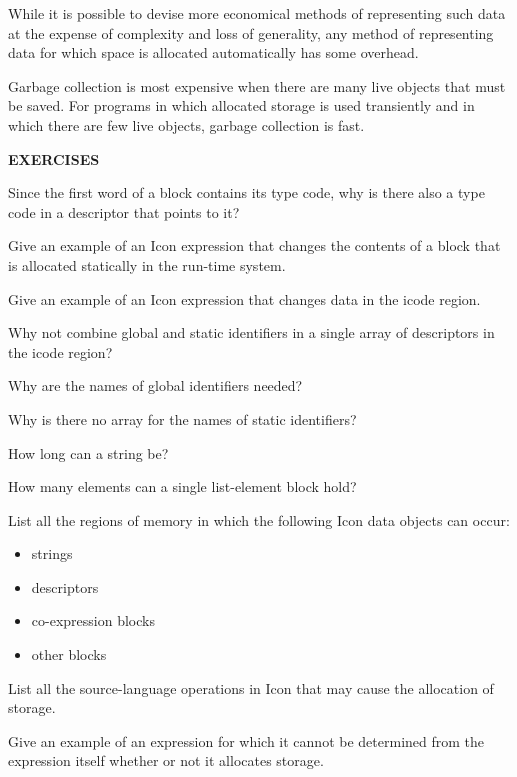 While it is possible to devise more economical methods of representing
such data at the expense of complexity and loss of generality, any
method of representing data for which space is allocated automatically
has some overhead.

Garbage collection is most expensive when there are many live objects
that must be saved. For programs in which allocated storage is used
transiently and in which there are few live objects, garbage
collection is fast.

\bigskip

\noindent\textbf{EXERCISES}

 Since the first word of a block contains its type
code, why is there also a type code in a descriptor that points to it?

 Give an example of an Icon expression that
changes the contents of a block that is allocated statically in the
run-time system.

 Give an example of an Icon expression that
changes data in the icode region.

 Why not combine global and static identifiers in
a single array of descriptors in the icode region?

 Why are the names of global identifiers needed?

 Why is there no array for the names of static identifiers?

 How long can a string be?

 How many elements can a single list-element block
hold?

 List all the regions of memory in which the
following Icon data objects can occur:
\begin{itemize}
\item 
strings
\item 
descriptors
\item 
co-expression blocks
\item 
other blocks
\end{itemize}

 List all the source-language operations in Icon
that may cause the allocation of storage.

 Give an example of an expression for which it
cannot be determined from the expression itself whether or not it
allocates storage.

